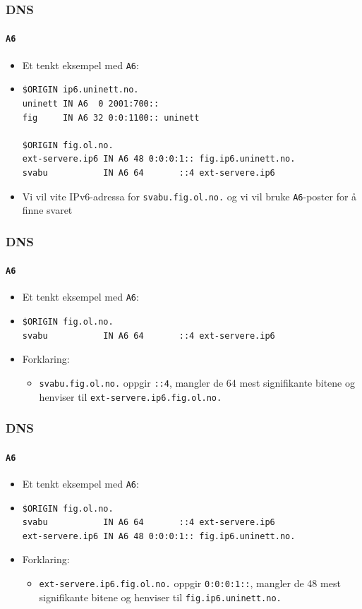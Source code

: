 \begin{frame}[fragile]%
  \frametitle{DNS}
  \framesubtitle{\texttt{A6}}
  \begin{itemize}[<+->]
  \item Et tenkt eksempel med \texttt{A6}:
  \item 
\begin{verbatim}
$ORIGIN ip6.uninett.no.
uninett IN A6  0 2001:700::
fig     IN A6 32 0:0:1100:: uninett

$ORIGIN fig.ol.no.
ext-servere.ip6 IN A6 48 0:0:0:1:: fig.ip6.uninett.no.
svabu           IN A6 64       ::4 ext-servere.ip6
\end{verbatim}
  \item Vi vil vite IPv6-adressa for \texttt{svabu.fig.ol.no.} og vi
    vil bruke \texttt{A6}-poster for å finne svaret
  \end{itemize}
\end{frame}

\begin{frame}[fragile]%
  \frametitle{DNS}
  \framesubtitle{\texttt{A6}}
  \begin{itemize}%
  \item Et tenkt eksempel med \texttt{A6}:
  \item 
\begin{verbatim}
$ORIGIN fig.ol.no.
svabu           IN A6 64       ::4 ext-servere.ip6
\end{verbatim}
  \item Forklaring:
    \begin{itemize}%
    \item \texttt{svabu.fig.ol.no.} oppgir \texttt{::4}, mangler de 64
      mest signifikante bitene og henviser til
      \texttt{ext-servere.ip6.fig.ol.no.}
    \end{itemize}
  \end{itemize}
\end{frame}

\begin{frame}[fragile]%
  \frametitle{DNS}
  \framesubtitle{\texttt{A6}}
  \begin{itemize}%
  \item Et tenkt eksempel med \texttt{A6}:
  \item 
\begin{verbatim}
$ORIGIN fig.ol.no.
svabu           IN A6 64       ::4 ext-servere.ip6
ext-servere.ip6 IN A6 48 0:0:0:1:: fig.ip6.uninett.no.
\end{verbatim}
  \item Forklaring:
    \begin{itemize}%
    \item \texttt{ext-servere.ip6.fig.ol.no.} oppgir
      \texttt{0:0:0:1::}, mangler de 48 mest signifikante bitene og
      henviser til \texttt{fig.ip6.uninett.no.}
    \end{itemize}
  \end{itemize}
\end{frame}

